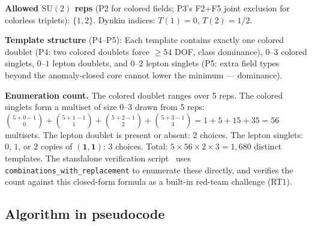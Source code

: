 \documentclass[11pt]{article}
\theoremstyle{definition}
\newcommand{\SU}{\mathrm{SU}}
\begin{document}
\smallskip\noindent\textbf{Allowed $\SU(2)$ reps} (P2 for colored
fields; P3's F2$+$F5 joint exclusion for colorless triplets):
$\{1, 2\}$.  Dynkin indices: $T(1) = 0$, $T(2) = 1/2$.

\smallskip\noindent\textbf{Template structure} (P4--P5):
Each template contains exactly one colored doublet (P4: two colored
doublets force $\ge 54$ DOF, class dominance), $0$--$3$ colored
singlets, $0$--$1$
lepton doublets, and $0$--$2$ lepton singlets (P5: extra field types
beyond the anomaly-closed core cannot lower the minimum ---
dominance).

\smallskip\noindent\textbf{Enumeration count.}\quad
The colored doublet ranges over 5 reps.  The colored singlets form a
multiset of size $0$--$3$ drawn from 5 reps: $\binom{5+0-1}{0} +
\binom{5+1-1}{1} + \binom{5+2-1}{2} + \binom{5+3-1}{3} = 1 + 5 + 15
+ 35 = 56$ multisets.  The lepton doublet is present or absent: 2
choices.  The lepton singlets: $0$, $1$, or $2$ copies of
$(\mathbf{1},\mathbf{1})$: 3 choices.  Total:
$5 \times 56 \times 2 \times 3 = 1{,}680$ distinct templates.
The standalone verification script~\cite{BrookeFermionScan}
uses \texttt{combinations\_with\_replacement} to enumerate these
directly, and verifies the count against this closed-form formula
as a built-in red-team challenge (RT1).

\subsection{Algorithm in pseudocode}
\label{app:pseudocode}
\end{document}
